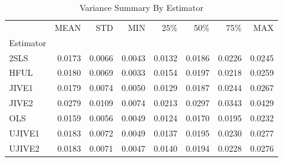 \begin{table}[ht]
\centering
\caption{Variance Summary By Estimator}
\begin{tabular}{lrrrrrrr}
\toprule
 & MEAN & STD & MIN & 25\% & 50\% & 75\% & MAX \\
Estimator &  &  &  &  &  &  &  \\
\midrule
2SLS & 0.0173 & 0.0066 & 0.0043 & 0.0132 & 0.0186 & 0.0226 & 0.0245 \\
HFUL & 0.0180 & 0.0069 & 0.0033 & 0.0154 & 0.0197 & 0.0218 & 0.0259 \\
JIVE1 & 0.0179 & 0.0074 & 0.0050 & 0.0129 & 0.0187 & 0.0244 & 0.0267 \\
JIVE2 & 0.0279 & 0.0109 & 0.0074 & 0.0213 & 0.0297 & 0.0343 & 0.0429 \\
OLS & 0.0159 & 0.0056 & 0.0049 & 0.0124 & 0.0170 & 0.0195 & 0.0232 \\
UJIVE1 & 0.0183 & 0.0072 & 0.0049 & 0.0137 & 0.0195 & 0.0230 & 0.0277 \\
UJIVE2 & 0.0183 & 0.0071 & 0.0047 & 0.0140 & 0.0194 & 0.0228 & 0.0276 \\
\bottomrule
\end{tabular}
\end{table}
